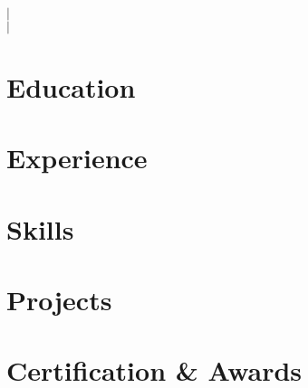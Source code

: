 \documentclass[]{article}
\begin{document}
\begin{center}
    {\fontsize{36}{36}\selectfont\interthin \firstname\interheavy \lastname} \\ \bigskip
    {\color{icnclr}} \href{tel:\phone}{\phone} $|$
    {\color{icnclr}\faEnvelope[regular]} \href{mailto:\email}{\email} \\ 
    {\color{icnclr}\faLinkedinIn} \href{https://\linkedin}{\linkedin} $|$
    {\color{icnclr}\faGithub} \href{https://\github}{\github} 
\end{center}


\section{Education}


\section{Experience}

\ifx\skills\undefined
\else
\section{Skills}
\skills
\fi


\section{Projects}

\section{Certification \& Awards}
\achievements
\end{document}
